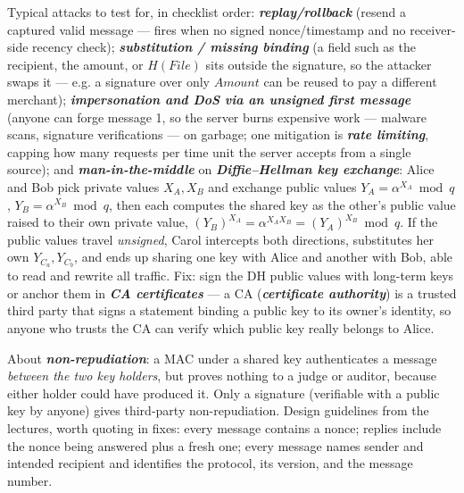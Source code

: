 \documentclass[12pt, a4paper]{article}
\newcommand{\term}[1]{\textbf{\textit{#1}}}        %
\begin{document}
Typical attacks to test for, in checklist order: \term{replay/rollback} (resend a captured valid message --- fires when no signed nonce/timestamp and no receiver-side recency check); \term{substitution / missing binding} (a field such as the recipient, the amount, or $H(File)$ sits outside the signature, so the attacker swaps it --- e.g. a signature over only $Amount$ can be reused to pay a different merchant); \term{impersonation and DoS via an unsigned first message} (anyone can forge message 1, so the server burns expensive work --- malware scans, signature verifications --- on garbage; one mitigation is \term{rate limiting}, capping how many requests per time unit the server accepts from a single source); and \term{man-in-the-middle} on \term{Diffie--Hellman key exchange}: Alice and Bob pick private values $X_A, X_B$ and exchange public values $Y_A = \alpha^{X_A} \bmod q$, $Y_B = \alpha^{X_B} \bmod q$, then each computes the shared key as the other's public value raised to their own private value, $(Y_B)^{X_A} = \alpha^{X_A X_B} = (Y_A)^{X_B} \bmod q$.
If the public values travel \emph{unsigned}, Carol intercepts both directions, substitutes her own $Y_{C_a}, Y_{C_b}$, and ends up sharing one key with Alice and another with Bob, able to read and rewrite all traffic.
Fix: sign the DH public values with long-term keys or anchor them in \term{CA certificates} --- a CA (\term{certificate authority}) is a trusted third party that signs a statement binding a public key to its owner's identity, so anyone who trusts the CA can verify which public key really belongs to Alice.

About \term{non-repudiation}: a MAC under a shared key authenticates a message \emph{between the two key holders}, but proves nothing to a judge or auditor, because either holder could have produced it.
Only a signature (verifiable with a public key by anyone) gives third-party non-repudiation. Design guidelines from the lectures, worth quoting in fixes: every message contains a nonce; replies include the nonce being answered plus a fresh one; every message names sender and intended recipient and identifies the protocol, its version, and the message number.
\end{document}
